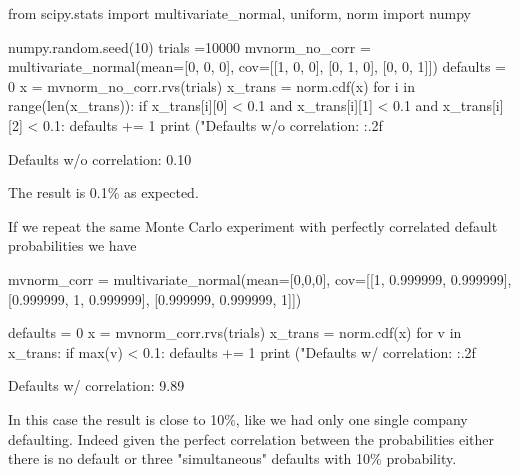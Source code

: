 \begin{ipython}
from scipy.stats import multivariate_normal, uniform, norm
import numpy

numpy.random.seed(10)
trials =10000
mvnorm_no_corr = multivariate_normal(mean=[0, 0, 0], cov=[[1, 0, 0],
                                                          [0, 1, 0],
                                                          [0, 0, 1]])
defaults = 0
x = mvnorm_no_corr.rvs(trials)
x_trans = norm.cdf(x)
for i in range(len(x_trans)):
    if x_trans[i][0] < 0.1 and x_trans[i][1] < 0.1 and x_trans[i][2] < 0.1:
        defaults += 1
print ("Defaults w/o correlation: {:.2f}%
\end{ipython}
\begin{ioutput}
Defaults w/o correlation: 0.10%
\end{ioutput}
\noindent
The result is 0.1\% as expected.

If we repeat the same Monte Carlo experiment with perfectly correlated default probabilities we have

\begin{ipython}
mvnorm_corr = multivariate_normal(mean=[0,0,0], 
                                  cov=[[1, 0.999999, 0.999999],
                                       [0.999999, 1, 0.999999],
                                       [0.999999, 0.999999, 1]])

defaults = 0
x = mvnorm_corr.rvs(trials)
x_trans = norm.cdf(x)
for v in x_trans:
    if max(v) < 0.1:
        defaults += 1
print ("Defaults w/ correlation: {:.2f}%
\end{ipython}
\begin{ioutput}
Defaults w/ correlation: 9.89%
\end{ioutput}
In this case the result is close to 10\%, like we had only one single company defaulting. 
Indeed given the perfect correlation between the probabilities either there is no default or three "simultaneous" defaults with 10\% probability.

